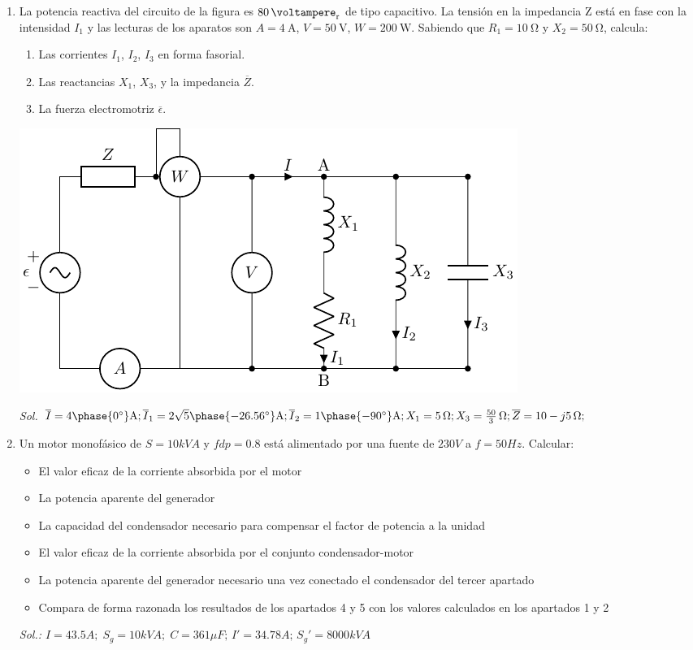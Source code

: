 \begin{enumerate}
\item La potencia reactiva del circuito de la figura es
  $\qty{80}{\voltampere_r}$ de tipo capacitivo. La tensión en la
  impedancia Z está en fase con la intensidad $I_1$ y las lecturas de
  los aparatos son $A = \qty{4}{\ampere}$, $V = \qty{50}{\volt}$,
  $W = \qty{200}{\watt}$. Sabiendo que $R_1 = \qty{10}{\ohm}$ y
  $X_2 = \qty{50}{\ohm}$, calcula:

  \begin{enumerate}
  \item Las corrientes $I_1$, $I_2$, $I_3$ en forma fasorial.
  \item Las reactancias $X_1$, $X_3$, y la impedancia $\overline{Z}$.
  \item La fuerza electromotriz $\overline{\epsilon}$.
  \end{enumerate}
  \begin{center}
    \includegraphics{../figs/BT2_circuitoCapacitivo}
  \end{center}
  \emph{Sol.
    $\overline{I} =
    4\phase{\ang{0}}\unit{\ampere};
    \overline{I}_1 =
    2\sqrt{5}\phase{\ang{-26.56}}\unit{\ampere}
    ; \overline{I}_2 =
    1\phase{\ang{-90}}\unit{\ampere} ; X_1 =
    \qty{5}{\ohm}; X_3 =
    \qty[parse-numbers=false]{\frac{50}{3}}{\ohm}; \overline{Z} =
    \qty[parse-numbers=false]{10 - j5}{\ohm}; $ }

\item Un motor monofásico de $S = {10}{kVA}$ y $fdp = 0.8$ está
  alimentado por una fuente de ${230}{V}$ a $f = {50}{Hz}$.  Calcular:
  \begin{itemize}
  \item El valor eficaz de la corriente absorbida por el motor
  \item La potencia aparente del generador
  \item La capacidad del condensador necesario para compensar el
    factor de potencia a la unidad
  \item El valor eficaz de la corriente absorbida por el conjunto
    condensador-motor
  \item La potencia aparente del generador necesario una vez conectado
    el condensador del tercer apartado
  \item Compara de forma razonada los resultados de los apartados 4 y
    5 con los valores calculados en los apartados 1 y 2
  \end{itemize}
  \emph{Sol.:
    $I= {43.5}{A};\; S_g = {10}{kVA};\;C={361}{\mu F};\, I'=34.78A;\,
    S_g' = {8000}{kVA}$}


\end{enumerate}
